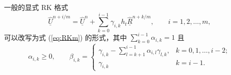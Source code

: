 %
\begin{lem}
一般的显式 RK 格式
\begin{equation}
\underline{\hat{U}}^{n+i/m}=\underline{\hat{U}}^{n}+\sum_{k=0}^{i-1}\gamma_{i,k}h_{t}\underline{\hat{R}}^{n+k/m},\qquad i=1,2,\dots,m,
\end{equation}
可以改写为式 (\ref{eq:RKm}) 的形式，其中 $\sum_{k=0}^{i-1}\alpha_{i,k}=1$ 且
\begin{equation}
\alpha_{i,k}\ge0,\qquad\beta_{i,k}=\begin{cases}
\gamma_{i,k}-\sum_{l=k+1}^{i-1}\alpha_{i,l}\gamma_{l,k}, & k=0,1,\dots,i-2;\\
\gamma_{i,k} & k=i-1.
\end{cases}
\end{equation}
\end{lem}

